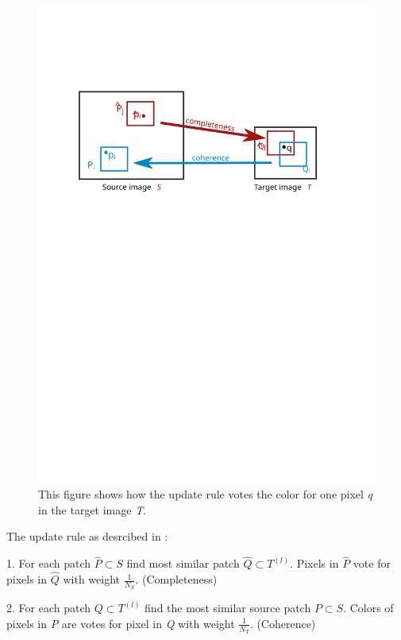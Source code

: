 \begin{figure}[h]
\centering
\includegraphics[scale=0.7]{img/updaterule}
\caption[Update rule]{This figure shows how the update rule votes the color for one pixel \textit{q} in the target image \textit{T}.}
\label{fig:Update rule}
\end{figure}

The update rule as desrcibed in \cite{bisi}:

\vspace{15px}
1. For each patch $\hat{P} \subset S$ find most similar patch $\hat{Q} \subset T^{(l)}$. Pixels in $\hat{P}$ vote for pixels in $\hat{Q}$ with weight $\frac{1}{N_{S}}$. (Completeness)

\vspace{15px}
2. For each patch $Q \subset T^{(l)}$ find the most similar source patch $P \subset S$. Colors of pixels in \textit{P} are votes for pixel in \textit{Q} with weight $\frac{1}{N_{T}}$. (Coherence)

